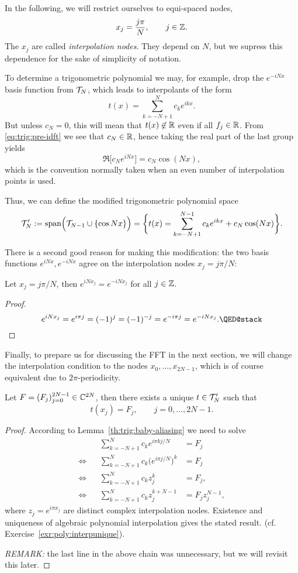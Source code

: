 In the following, we will restrict ourselves to equi-spaced nodes,
\[
  x_j =  \frac{j \pi}{N},  \qquad j \in \mathbb{Z}.
\]
The $x_j$ are called {\em interpolation nodes}. They depend on $N$, but we
supress this dependence for the sake of simplicity of notation.

To determine a trigonometric polynomial we may, for example,
drop the $e^{-iNx}$ basis function from $\mathcal{T}_N$, which leads to
interpolants of the form
\[
    t(x) = \sum_{k = -N+1}^N c_k e^{ik x}.
\]
But unless $c_N = 0$, this will mean that $t(x) \not\in \mathbb{R}$ even if all $f_j \in
\mathbb{R}$. From \eqref{eq:trig:pre-idft} we see that $c_N \in \mathbb{R}$, hence taking
the real part of the last group yields
\[
    \Re \big[ c_N e^{i N x} \big]   = c_N \cos(Nx),
\]
which is the convention normally taken when an even number of interpolation
points is used.

Thus, we can define the modified trigonometric polynomial space
\[
  \mathcal{T}_N' := {\rm span}\Big(\mathcal{T}_{N-1} \cup \{ \cos N x \} \Big)
    =  \bigg\{ t(x) = \sum_{k = -N+1}^{N-1} c_k e^{ikx} + c_N \cos(Nx) \bigg\}.
\]

There is a second good reason for making this modification: the two
basis functions $e^{iNx}, e^{-iNx}$ agree on the interpolation nodes
$x_j = j \pi / N$:

\begin{lemma} \label{th:trig:baby-aliasing}
  Let $x_j = j \pi / N$, then $e^{iN x_j} = e^{-iNx_j}$ for all
  $j \in \mathbb{Z}$.
\end{lemma}
\begin{proof}
  \[
    e^{iNx_j} = e^{i \pi j} = (-1)^j = (-1)^{-j} = e^{-i\pi j} = e^{-iNx_j}.
    \qedhere
  \]
\end{proof}


Finally, to prepare us for discussing the FFT in the next section, we will
change the interpolation condition to the nodes $x_0, \dots, x_{2N-1}$, which is
of course equivalent due to $2\pi$-periodicity.

\begin{lemma}
  Let $F  = (F_j)_{j = 0}^{2N-1} \in \mathbb{C}^{2N}$, then there exists a unique
  $t \in \mathcal{T}_N'$ such that
  \[
    t(x_j) = F_j, \qquad j = 0, \dots, 2N-1.
  \]
\end{lemma}
\begin{proof}
  According to Lemma~\ref{th:trig:baby-aliasing} we need to solve
  \begin{align*}
      && \sum_{k = -N+1}^N c_k e^{i\pi k j/N} &= F_j \\
      \Leftrightarrow &&
      \sum_{k = -N+1}^N c_k \big(e^{i\pi j/N}\big)^k &= F_j \\
      \Leftrightarrow &&
      \sum_{k = -N+1}^N c_k z_j^k &= F_j, \\
      \Leftrightarrow &&
      \sum_{k = -N+1}^N c_k z_j^{k+N-1} &= F_j z_j^{N-1},
  \end{align*}
  where $z_j = e^{i\pi x_j}$ are distinct complex interpolation nodes. Existence
  and uniqueness of algebraic polynomial interpolation gives the stated result.
  (cf. Exercise~\ref{exr:poly:interpunique}).

  {\it REMARK: } the last line in the above chain was unnecessary, but we will
  revisit this later.
\end{proof}


